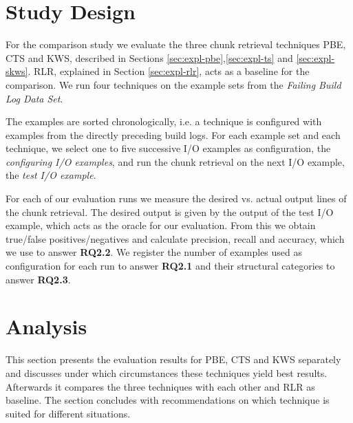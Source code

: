\documentclass[\myrootdir/main.tex]{subfiles}
\begin{document}
\section{Study Design}
For the comparison study we evaluate the three chunk retrieval techniques PBE, CTS and KWS, described in Sections \ref{sec:expl-pbe},\ref{sec:expl-ts} and \ref{sec:expl-skws}.
RLR, explained in Section \ref{sec:expl-rlr}, acts as a baseline for the comparison.
We run four techniques on the example sets from the \emph{Failing Build Log Data Set}.

The examples are sorted chronologically, i.e. a technique is configured with examples from the directly preceding build logs.
For each example set and each technique, we select one to five successive I/O examples as configuration, the \emph{configuring I/O examples}, and run the chunk retrieval on the next I/O example, the \emph{test I/O example}.

For each of our evaluation runs we measure the desired vs. actual output lines of the chunk retrieval.
The desired output is given by the output of the test I/O example, which acts as the oracle for our evaluation.
From this we obtain true/false positives/negatives and calculate precision, recall and accuracy, which we use to answer \textbf{RQ2.2}.
We register the number of examples used as configuration for each run to answer \textbf{RQ2.1} and their structural categories to answer \textbf{RQ2.3}.



\section{Analysis}
This section presents the evaluation results for PBE, CTS and KWS separately and discusses under which circumstances these techniques yield best results.
Afterwards it compares the three techniques with each other and RLR as baseline.
The section concludes with recommendations on which technique is suited for different situations.

\end{document}
